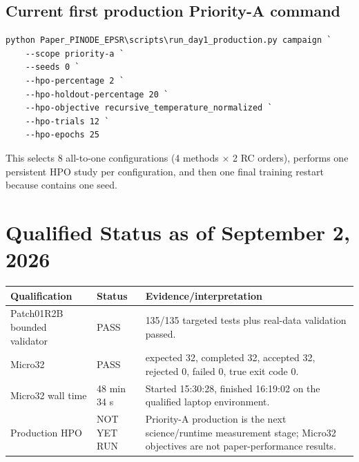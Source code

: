 \documentclass[11pt]{article}
\newcommand{\code}[1]{\texttt{\detokenize{#1}}}
\begin{document}
\subsection{Current first production Priority-A command}
\begin{verbatim}
python Paper_PINODE_EPSR\scripts\run_day1_production.py campaign `
    --scope priority-a `
    --seeds 0 `
    --hpo-percentage 2 `
    --hpo-holdout-percentage 20 `
    --hpo-objective recursive_temperature_normalized `
    --hpo-trials 12 `
    --hpo-epochs 25
\end{verbatim}
This selects 8 all-to-one configurations (4 methods $\times$ 2 RC orders), performs one persistent HPO study per configuration, and then one final training restart because \code{--seeds 0} contains one seed.

\section{Qualified Status as of September 2, 2026}
\begin{table}[h]
\centering
\begin{tabularx}{\textwidth}{L{0.34\textwidth}L{0.18\textwidth}Y}
\toprule
\textbf{Qualification} & \textbf{Status} & \textbf{Evidence/interpretation} \\
\midrule
Patch01R2B bounded validator & PASS & 135/135 targeted tests plus real-data validation passed. \\
Micro32 & PASS & expected 32, completed 32, accepted 32, rejected 0, failed 0, true exit code 0. \\
Micro32 wall time & 48 min 34 s & Started 15:30:28, finished 16:19:02 on the qualified laptop environment. \\
Production HPO & NOT YET RUN & Priority-A production is the next science/runtime measurement stage; Micro32 objectives are not paper-performance results. \\
\bottomrule
\end{tabularx}
\end{table}
\end{document}
